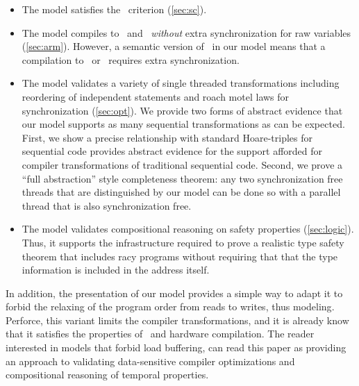 
\begin{itemize}
\item The model satisfies the \drfsc\ criterion  (\textsection\ref{sec:sc}).

\item The model compiles to \armeight\ and \tso\ {\em without} extra synchronization for raw variables  (\textsection\ref{sec:arm}).
However, a semantic version of \mca\ in our model means that a compilation to \armseven\ or \ppc\ requires extra synchronization.  

\item The model validates a variety of single threaded transformations including reordering of independent statements and roach motel laws for synchronization  (\textsection\ref{sec:opt}).
%
We provide two forms of abstract evidence that our model supports as many sequential transformations as can be expected.  First, we show a precise relationship with standard Hoare-triples for sequential code provides abstract evidence for the support afforded for compiler  transformations of traditional sequential code.  Second, we prove a ``full abstraction'' style completeness  theorem: any two synchronization free threads that are distinguished by our model can be done so with a parallel thread that is also synchronization free. 

\item The model validates compositional reasoning on safety properties (\textsection\ref{sec:logic}).  Thus, it supports the infrastructure required to prove a realistic type safety theorem that includes racy programs without requiring that that the type information is included in the address itself.
\end{itemize}
In addition, the presentation of our model provides a simple way to adapt it to forbid the relaxing of the program order from reads to writes, thus modeling\cite{Dolan:2018:BDR:3192366.3192421,BoehmOOTA}.  Perforce, this variant limits the compiler transformations, and it is already know that it satisfies the properties of \drfsc\ and hardware compilation.   The reader interested in models that forbid load buffering, can read this paper as providing an approach to validating data-sensitive compiler optimizations and compositional reasoning of temporal properties.   


